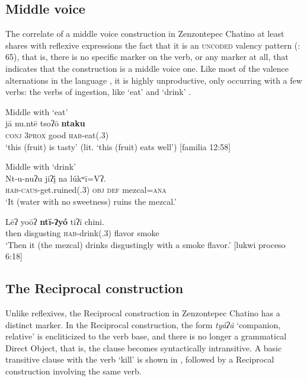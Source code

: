\documentclass[output=paper]{../langscibook}
\begin{document}
\subsection{Middle voice}
\label{sec:campbell:5.1}

The correlate of a middle voice construction in Zenzontepec Chatino at least shares with reflexive expressions the fact that it is an \textsc{uncoded} valency pattern (\citealt{HaspelmathHartmann2015}: 65), that is, there is no specific marker on the verb, or any marker at all, that indicates that the construction is a middle voice one. Like most of the valence alternations in the language \citep{Campbell2015}, it is highly unproductive, only occurring with a few verbs: the verbs of ingestion, like ‘eat’  and ‘drink’ .


\ea\label{ex:campbell:40}
{Middle with ‘eat’}\\
\gll jā  nu.ntē  tsoʔō  \textbf{ntaku}\\
     \textsc{conj}  \textsc{3prox}  good  \textsc{hab-}eat(.3)\\
\glt ‘this (fruit) is tasty’ (lit. ‘this (fruit) eats well’) [familia 12:58]
\z

\ea\label{ex:campbell:41}
{Middle with ‘drink’}\\
\ea
\gll Nt-u-nuʔu  jiʔį̄  na  lúkʷī=Vʔ.  \\
     \textsc{hab-caus-}get.ruined(.3)  \textsc{obj}  \textsc{def}  mezcal=\textsc{ana}  \\
\glt ‘It (water with no sweetness) ruins the mezcal.’

\ex
\gll Lēʔ  yoōʔ  \textbf{ntī-ʔyó}  tiʔī  chini.\\
     then  disgusting  \textsc{hab-}drink(.3)  flavor  smoke\\
\glt ‘Then it (the mezcal) drinks disgustingly with a smoke flavor.’ [lukwi proceso 6:18]
\z
\z

\subsection{The Reciprocal construction}
\label{sec:campbell:5.2}

Unlike reflexives, the Reciprocal construction in Zenzontepec Chatino has a distinct marker. In the Reciprocal construction, the form \textit{tyáʔā} ‘companion, relative’ is encliticized to the verb base, and there is no longer a grammatical Direct Object, that is, the clause becomes syntactically intransitive. A basic transitive clause with the verb ‘kill’ is shown in , followed by a Reciprocal construction involving the same verb.
\end{document}

